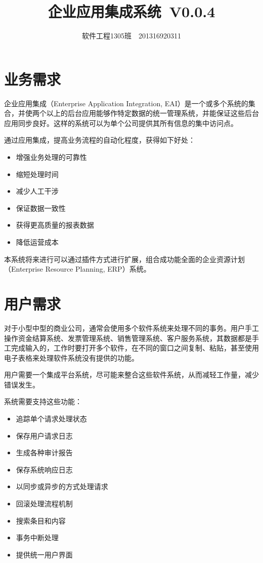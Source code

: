 \documentclass[cs4size,a4paper,nofonts]{ctexart}
\def\tjf{{\tt{田劲锋}}}
\def\titlec{企业应用集成系统}
\def\version{V0.0.4}
\begin{document}

\title{\bf\titlec~\version}
\author{软件工程1305班~\quad\tjf\quad~201316920311}
\maketitle

\section{业务需求}

企业应用集成（Enterprise Application Integration, EAI）是一个或多个系统的集合，并使两个以上的后台应用能够作特定数据的统一管理系统，并能保证这些后台应用同步良好。这样的系统可以为单个公司提供其所有信息的集中访问点。

通过应用集成，提高业务流程的自动化程度，获得如下好处：

\begin{itemize}
\item 增强业务处理的可靠性
\item 缩短处理时间
\item 减少人工干涉
\item 保证数据一致性
\item 获得更高质量的报表数据
\item 降低运营成本
\end{itemize}

本系统将来进行可以通过插件方式进行扩展，组合成功能全面的企业资源计划（Enterprise Resource Planning, ERP）系统。

\section{用户需求}

对于小型中型的商业公司，通常会使用多个软件系统来处理不同的事务。用户手工操作资金结算系统、发票管理系统、销售管理系统、客户服务系统，其数据都是手工完成输入的，工作时要打开多个软件，在不同的窗口之间复制、粘贴，甚至使用电子表格来处理软件系统没有提供的功能。

用户需要一个集成平台系统，尽可能来整合这些软件系统，从而减轻工作量，减少错误发生。

系统需要支持这些功能：

\begin{itemize}
\item 追踪单个请求处理状态
\item 保存用户请求日志
\item 生成各种审计报告
\item 保存系统响应日志
\item 以同步或异步的方式处理请求
\item 回滚处理流程机制
\item 搜索条目和内容
\item 事务中断处理
\item 提供统一用户界面
\end{itemize}
\end{document}
